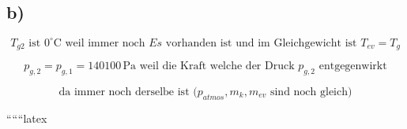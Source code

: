 

\subsection*{b)}

\begin{equation*}
    T_{g2} \text{ ist } 0^\circ \text{C weil immer noch } Es \text{ vorhanden ist und im Gleichgewicht ist } T_{ev} = T_g
\end{equation*}

\begin{equation*}
    p_{g,2} = p_{g,1} = 140100 \, \text{Pa weil die Kraft welche der Druck } p_{g,2} \text{ entgegenwirkt}
\end{equation*}

\begin{equation*}
    \text{da immer noch derselbe ist (} p_{atmos}, m_k, m_{ev} \text{ sind noch gleich)}
\end{equation*}

``````latex